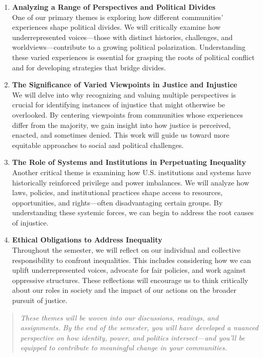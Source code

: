 \documentclass[]{tufte-handout}
\begin{document}
\begin{enumerate}
\def\labelenumi{\arabic{enumi}.}
\item
  \textbf{Analyzing a Range of Perspectives and Political Divides}\\
  One of our primary themes is exploring how different communities'
  experiences shape political divides. We will critically examine how
  underrepresented voices---those with distinct histories, challenges,
  and worldviews---contribute to a growing political polarization.
  Understanding these varied experiences is essential for grasping the
  roots of political conflict and for developing strategies that bridge
  divides.
\item
  \textbf{The Significance of Varied Viewpoints in Justice and
  Injustice}\\
  We will delve into why recognizing and valuing multiple perspectives
  is crucial for identifying instances of injustice that might otherwise
  be overlooked. By centering viewpoints from communities whose
  experiences differ from the majority, we gain insight into how justice
  is perceived, enacted, and sometimes denied. This work will guide us
  toward more equitable approaches to social and political challenges.
\item
  \textbf{The Role of Systems and Institutions in Perpetuating
  Inequality}\\
  Another critical theme is examining how U.S. institutions and systems
  have historically reinforced privilege and power imbalances. We will
  analyze how laws, policies, and institutional practices shape access
  to resources, opportunities, and rights---often disadvantaging certain
  groups. By understanding these systemic forces, we can begin to
  address the root causes of injustice.
\item
  \textbf{Ethical Obligations to Address Inequality}\\
  Throughout the semester, we will reflect on our individual and
  collective responsibility to confront inequalities. This includes
  considering how we can uplift underrepresented voices, advocate for
  fair policies, and work against oppressive structures. These
  reflections will encourage us to think critically about our roles in
  society and the impact of our actions on the broader pursuit of
  justice.
\end{enumerate}

\begin{quote}
\emph{These themes will be woven into our discussions, readings, and
assignments. By the end of the semester, you will have developed a
nuanced perspective on how identity, power, and politics intersect---and
you'll be equipped to contribute to meaningful change in your
communities.}
\end{quote}
\end{document}
